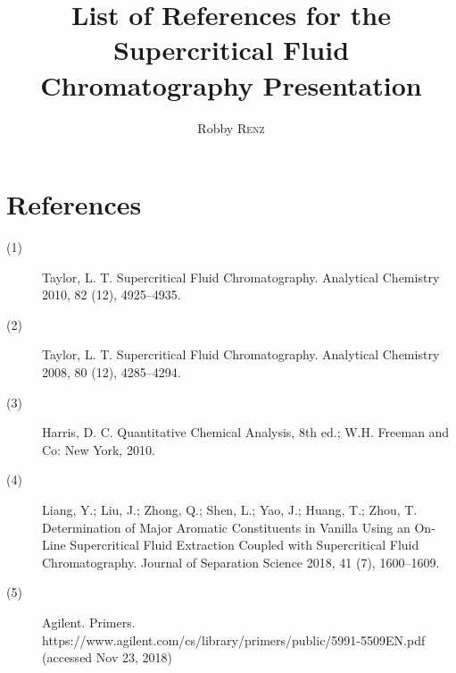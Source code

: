 \documentclass[12pt, a4paper]{article}
\author{Robby \textsc{Renz}}
\title{List of References for the Supercritical Fluid Chromatography Presentation}
\begin{document}
\maketitle

\section{References}
\begin{description}
	\item[(1)] Taylor, L. T. Supercritical Fluid Chromatography. Analytical Chemistry 2010, 82 (12), 4925–4935.
	\item[(2)] Taylor, L. T. Supercritical Fluid Chromatography. Analytical Chemistry 2008, 80 (12), 4285–4294.
	\item[(3)] Harris, D. C. Quantitative Chemical Analysis, 8th ed.; W.H. Freeman and Co: New York, 2010.
	\item[(4)] Liang, Y.; Liu, J.; Zhong, Q.; Shen, L.; Yao, J.; Huang, T.; Zhou, T. Determination of Major Aromatic Constituents in Vanilla Using an On-Line Supercritical Fluid Extraction Coupled with Supercritical Fluid Chromatography. Journal of Separation Science 2018, 41 (7), 1600–1609.
	\item[(5)] Agilent. Primers. https://www.agilent.com/cs/library/primers/public/5991-5509EN.pdf (accessed Nov 23, 2018)
\end{description}
\end{document}
